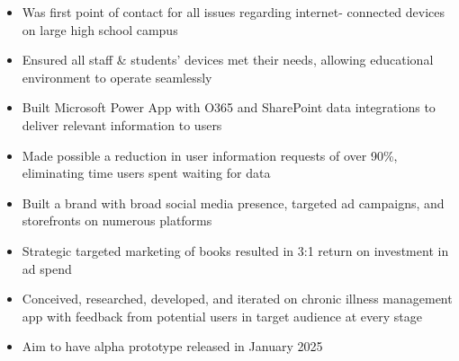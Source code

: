\par\bigskip
{}
\par\smallskip
\begin{minipage}{13.75cm}
  \begin{minipage}{6.5cm}
    \begin{itemize}
      \item Was first point of contact for all issues regarding internet-
            connected devices on large high school campus
      \item Ensured all staff \& students' devices met their needs,
            allowing educational environment to operate seamlessly
    \end{itemize}
  \end{minipage}
  \hfill
  \begin{minipage}{6.5cm}
    \begin{itemize}
      \item Built Microsoft Power App with O365 and SharePoint data
            integrations to deliver relevant information to users
      \item Made possible a reduction in user information requests of
            over 90\%, eliminating time users spent waiting for data
    \end{itemize}
  \end{minipage}
\end{minipage}
\par\smallskip
\divider

\par\smallskip
\begin{minipage}{13.75cm}
  \begin{minipage}{6.5cm}
    \begin{itemize}
      \item Built a brand with broad social media presence, targeted
            ad campaigns, and storefronts on numerous platforms
      \item Strategic targeted marketing of books resulted in 3:1
            return on investment in ad spend
    \end{itemize}
  \end{minipage}
  \hfill
  \begin{minipage}{6.5cm}
    \begin{itemize}
      \item Conceived, researched, developed, and iterated on
            chronic illness management app with feedback from
            potential users in target audience at every stage
      \item Aim to have alpha prototype released in January 2025
    \end{itemize}
  \end{minipage}
\end{minipage}
\par\smallskip
\divider

